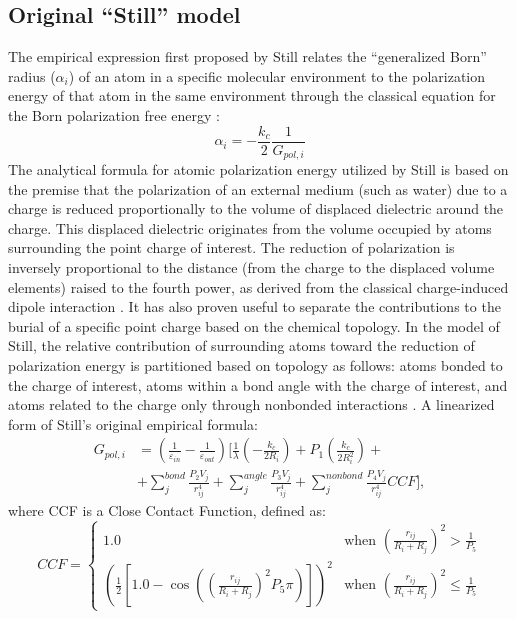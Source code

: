 \documentclass[11pt]{book}
\begin{document}
\subsection{Original ``Still'' model}
The empirical expression first proposed by Still relates the ``generalized Born'' radius ($\alpha_{i}$) of an atom in a specific molecular environment to the polarization energy of that atom in the same
environment through the classical equation for the Born polarization free energy \cite{StillJACS90,QiuJPC97,DominyJPC99}:
\begin{equation}\label{eq:gb-still1}
\alpha_{i}=-\frac{k_{c}}{2}\frac{1}{G_{pol,i}}
\end{equation}
The analytical formula for atomic polarization energy utilized by Still is based on the premise that the polarization of an external medium (such as water) due to a charge is reduced proportionally to the volume of displaced dielectric around the charge. This displaced dielectric originates from the volume occupied by atoms surrounding the point charge of interest. The reduction of polarization is inversely proportional to the distance (from the charge to the displaced volume elements) raised to the fourth power, as derived from the classical charge-induced dipole interaction \cite{GilsonJCAMD91}. It has also proven useful to separate the contributions to the burial of a specific point charge based on the chemical topology. In the model of Still, the relative contribution of surrounding atoms toward the reduction of polarization energy is partitioned based on topology as follows: atoms bonded to the charge of interest, atoms within a bond angle with the charge of interest, and atoms related to the charge only through nonbonded interactions \cite{DominyJPC99,QiuJPC97}. A linearized form of Still's original empirical formula:
\begin{equation}\label{eq:gb-still2}
\begin{split}
G_{pol,i}&=\left(\frac{1}{\varepsilon_{in}}-\frac{1}{\varepsilon_{out}}\right)\biggl[\frac{1}{\lambda}\left(-\frac{k_{c}}{2R_{i}}\right)+P_{1}\left(\frac{k_{c}}{2R_{i}^{2}}\right)+\\
&+\sum_{j}^{bond}\frac{P_{2}V_{j}}{r_{ij}^{4}}+\sum_{j}^{angle}\frac{P_{3}V_{j}}{r_{ij}^{4}}+\sum_{j}^{nonbond}\frac{P_{4}V_{j}}{r_{ij}^{4}}CCF\biggr],
\end{split}
\end{equation}
where CCF is a Close Contact Function, defined as:
\begin{equation}\label{eq:gb-ccf}
CCF=
\begin{cases}
	1.0 & \text{when }\left(\frac{r_{ij}}{R_{i}+R_{j}}\right)^2>\frac{1}{P_{5}} \\
	\left(\frac{1}{2}\left[1.0-\cos\left(\left(\frac{r_{ij}}{R_{i}+R_{j}}\right)^{2}P_{5}\pi\right)\right]\right)^{2} & \text{when }\left(\frac{r_{ij}}{R_{i}+R_{j}}\right)^2\le \frac{1}{P_{5}}
\end{cases}
\end{equation}
\end{document}
